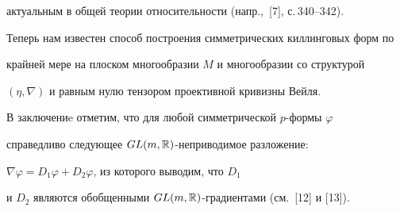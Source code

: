 актуальным в общей теории относительности (напр.,~[7], с.\,340--342).


Теперь нам известен способ построения симметрических киллинговых форм по


крайней мере на плоском многообразии $M$ и многообразии со структурой


$(\eta,\nabla)$ и равным нулю тензором проективной кривизны Вейля.





В заключениe отметим, что для любой симметрической $p$-формы $\varphi$


справедливо следующее $GL(m,\Bbb R)$-неприводимое разложение:


$\nabla \varphi=D_1\varphi+D_2\varphi$, из которого выводим, что $D_1$


и $D_2$ являются обобщенными $GL(m,\Bbb R)$-градиентами (см.~[12] и [13]).








